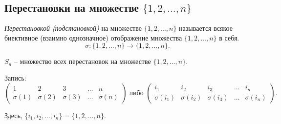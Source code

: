 \subsection{Перестановки на множестве $\{1, 2, \dots, n\}$}

\begin{definition}
    \textit{Перестановкой (подстановкой)} на множестве $\{1, 2, \dots, n\}$ называется всякое биективное (взаимно однозначное) отображение множества $\{1, 2, \dots, n\}$ в себя.
    \begin{equation*}
        \sigma : \{1, 2, \dots, n\} \to \{1, 2, \dots, n\}
    .\end{equation*}

    $S_n$ -- множество всех перестановок на множестве $\{1, 2, \dots, n\}$.
\end{definition}

Запись:
\begin{equation*}
    \begin{pmatrix}
        1 & 2 & 3 & \dots & n \\
        \sigma(1) & \sigma(2) & \sigma(3) & \dots & \sigma(n)
    \end{pmatrix} \text{ либо }
    \begin{pmatrix} 
        i_1 & i_2 & i_3 & \dots & i_n \\
        \sigma(i_1) & \sigma(i_2) & \sigma(i_3) & \dots & \sigma(i_n)
    \end{pmatrix} 
.\end{equation*}

Здесь, $\{i_1, i_2, \dots, i_n\} = \{1, 2, \dots, n\}$.

\begin{comment}
    Количество всех перестановок длины $n$: $|S_n| = n!$
\end{comment}
